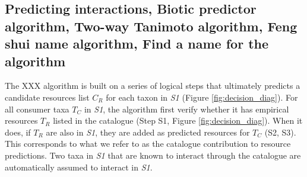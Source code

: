 \documentclass[letterpaper]{article}
\begin{document}
  \subsection{Predicting interactions, Biotic predictor algorithm, Two-way Tanimoto algorithm, Feng shui name algorithm, Find a name for the algorithm}



The XXX algorithm is built on a series of logical steps that ultimately predicts a candidate resources list $C_R$ for each taxon in \textit{S1} (Figure \ref{fig:decision_diag}). For all consumer taxa $T_C$ in \textit{S1}, the algorithm first verify whether it has empirical resources $T_R$ listed in the catalogue (Step S1, Figure \ref{fig:decision_diag}). When it does, if $T_R$ are also in \textit{S1}, they are added as predicted resources for $T_C$ (S2, S3). This corresponds to what we refer to as the catalogue contribution to resource predictions. Two taxa in \textit{S1} that are known to interact through the catalogue are automatically assumed to interact in \textit{S1}.
\end{document}
